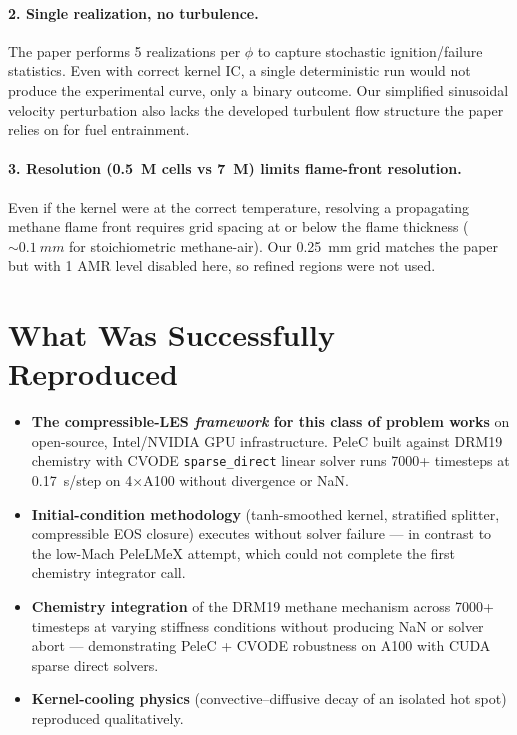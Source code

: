 \documentclass[11pt,a4paper]{article}
\begin{document}
\paragraph{2. Single realization, no turbulence.}
The paper performs 5 realizations per $\phi$ to capture stochastic ignition/failure statistics. Even with correct kernel IC, a single deterministic run would not produce the experimental curve, only a binary outcome. Our simplified sinusoidal velocity perturbation also lacks the developed turbulent flow structure the paper relies on for fuel entrainment.

\paragraph{3. Resolution (0.5~M cells vs 7~M) limits flame-front resolution.}
Even if the kernel were at the correct temperature, resolving a propagating methane flame front requires grid spacing at or below the flame thickness ($\sim\SI{0.1}{mm}$ for stoichiometric methane-air). Our \SI{0.25}{mm} grid matches the paper but with 1 AMR level disabled here, so refined regions were not used.

\section{What Was Successfully Reproduced}

\begin{itemize}[leftmargin=*]
    \item \textbf{The compressible-LES \emph{framework} for this class of problem works} on open-source, Intel/NVIDIA GPU infrastructure. PeleC built against DRM19 chemistry with CVODE \texttt{sparse\_direct} linear solver runs 7000+ timesteps at \SI{0.17}{s/step} on 4$\times$A100 without divergence or NaN.
    \item \textbf{Initial-condition methodology} (tanh-smoothed kernel, stratified splitter, compressible EOS closure) executes without solver failure — in contrast to the low-Mach PeleLMeX attempt, which could not complete the first chemistry integrator call.
    \item \textbf{Chemistry integration} of the DRM19 methane mechanism across 7000+ timesteps at varying stiffness conditions without producing NaN or solver abort — demonstrating PeleC + CVODE robustness on A100 with CUDA sparse direct solvers.
    \item \textbf{Kernel-cooling physics} (convective--diffusive decay of an isolated hot spot) reproduced qualitatively.
\end{itemize}
\end{document}
